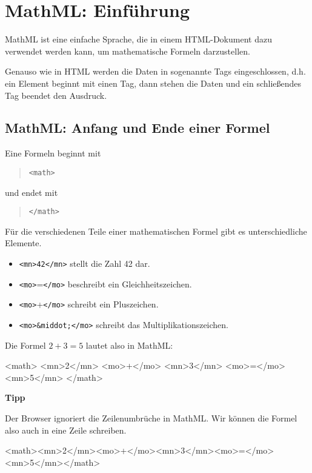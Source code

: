 \section{MathML: Einführung}

MathML ist eine einfache Sprache, die in einem HTML-Dokument dazu verwendet werden kann, um mathematische Formeln darzustellen.

Genauso wie in HTML werden die Daten in sogenannte Tags eingeschlossen, d.h. ein Element beginnt mit einen Tag, dann stehen die Daten und ein schließendes Tag beendet den Ausdruck. 

\subsection*{MathML: Anfang und Ende einer Formel}

Eine Formeln beginnt mit

\begin{quote}
	\texttt{<math>}
\end{quote}

und endet mit

\begin{quote}
	\texttt{</math>}
\end{quote}

Für die verschiedenen Teile einer mathematischen Formel gibt es unterschiedliche Elemente.
\begin{itemize}
	\item \texttt{<mn>42</mn>} stellt die Zahl 42 dar.
	\item \texttt{<mo>}=\texttt{</mo>} beschreibt ein Gleichheitszeichen.
	\item \texttt{<mo>}+\texttt{</mo>} schreibt ein Pluszeichen.
	\item \texttt{<mo>\&middot;</mo>} schreibt das Multiplikationszeichen.
\end{itemize}

Die Formel $2 + 3 = 5$ lautet also in MathML:

\begin{codeHTML}
<math>
	<mn>2</mn>
	<mo>+</mo>
	<mn>3</mn>
	<mo>=</mo>
	<mn>5</mn>
</math>
\end{codeHTML}

\textbf{Tipp}

Der Browser ignoriert die Zeilenumbrüche in MathML. Wir können die Formel also auch in eine Zeile schreiben.

\begin{codeHTML}
<math><mn>2</mn><mo>+</mo><mn>3</mn><mo>=</mo><mn>5</mn></math>
\end{codeHTML}

